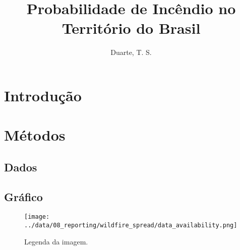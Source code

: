 \documentclass[journal]{IEEEtran}
\begin{document}
\title{Probabilidade de Incêndio no Território do Brasil}
\author{Duarte, T. S.}

\maketitle

\begin{abstract}
\lipsum[1]
\end{abstract}

\section{Introdução}

\section{Métodos}

\subsection{Dados}

\subsection{Gráfico}
\begin{figure}[h]
\centering
\texttt{[image: ../data/08\_reporting/wildfire\_spread/data\_availability.png]}
\caption{Legenda da imagem.}
\label{fig:meu_rotulo}
\end{figure}
\end{document}
